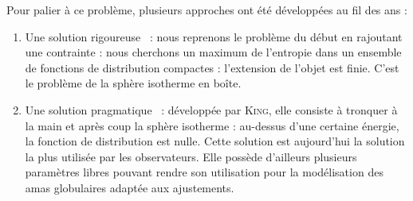 	Pour palier à ce problème, plusieurs approches ont été développées au fil des ans :
	\begin{enumerate}
		\item Une solution \og rigoureuse \fg~: nous reprenons le problème du début en rajoutant une contrainte : nous cherchons un maximum de l'entropie dans un ensemble de fonctions de distribution compactes :
			l'extension de l'objet est finie. C'est le problème de la sphère isotherme en boîte.
		\item Une solution \og pragmatique \fg~: développée par \textsc{King}, elle consiste à tronquer à la main et après coup la sphère isotherme : au-dessus d'une certaine énergie, la fonction de distribution est nulle.
			Cette solution est aujourd'hui la solution la plus utilisée par les observateurs. Elle possède d'ailleurs plusieurs paramètres libres pouvant rendre son utilisation pour la modélisation des amas globulaires adaptée
			aux ajustements.
	\end{enumerate}

